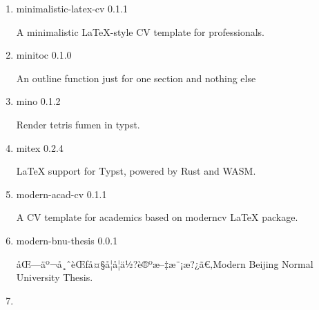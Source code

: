 \begin{enumerate}

  { minimal-presentation } { 0.3.0 }

  A modern minimalistic presentation template ready to use
\item
  \href{/universe/package/minimalistic-latex-cv/}{}


  { minimalistic-latex-cv } { 0.1.1 }

  A minimalistic LaTeX-style CV template for professionals.
\item
  \href{/universe/package/minitoc/}{}

  { minitoc } { 0.1.0 }

  An outline function just for one section and nothing else
\item
  \href{/universe/package/mino/}{}

  { mino } { 0.1.2 }

  Render tetris fumen in typst.
\item
  \href{/universe/package/mitex/}{}

  { mitex } { 0.2.4 }

  LaTeX support for Typst, powered by Rust and WASM.
\item
  \href{/universe/package/modern-acad-cv/}{}


  { modern-acad-cv } { 0.1.1 }

  A CV template for academics based on moderncv LaTeX package.
\item
  \href{/universe/package/modern-bnu-thesis/}{}


  { modern-bnu-thesis } { 0.0.1 }

  åŒ---äº¬å¸ˆèŒƒå¤§å­¦å­¦ä½?è®ºæ--‡æ¨¡æ?¿ã€‚Modern Beijing Normal
  University Thesis.
\item
  \href{/universe/package/modern-cug-thesis/}{}



\end{enumerate}
